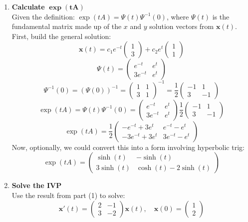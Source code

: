 \documentclass[12pt]{article}
\begin{document}
\begin{enumerate}  
    \item \textbf{Calculate} $\boldsymbol{\exp(tA)}$ \\
    Given the definition: $\exp(tA) = \Psi(t) \Psi^{-1}(0)$, where $\Psi(t)$ is the fundamental matrix made up of the $x$ and $y$ solution vectors from $\mathbf{x}(t)$. \\
    First, build the general solution: 
    \[ \mathbf{x}(t) = c_1 e^{-t} \begin{pmatrix} 1 \\ 3 \end{pmatrix} + c_2 e^{t} \begin{pmatrix} 1 \\ 1 \end{pmatrix} \]
    \[\Psi(t) = \begin{pmatrix} e^{-t} & e^{t} \\ 3e^{-t} & e^{t}\end{pmatrix}\]
    \[\Psi^{-1}(0) = (\Psi(0))^{-1} = \begin{pmatrix} 1 & 1 \\ 3 & 1 \end{pmatrix}^{-1} = \frac{1}{2} \begin{pmatrix} -1 & 1 \\ 3 & -1 \end{pmatrix}\]
    \[ \exp(tA) = \Psi(t)\Psi^{-1}(0) = \begin{pmatrix} e^{-t} & e^{t} \\ 3e^{-t} & e^{t}\end{pmatrix} \frac{1}{2} \begin{pmatrix} -1 & 1 \\ 3 & -1 \end{pmatrix}\]
    \[ \exp(tA) = \frac{1}{2} \begin{pmatrix} -e^{-t} + 3e^{t} & e^{-t} - e^{t} \\ -3e^{-t}+3e^{t} & 3e^{-t} - e^{t}\end{pmatrix}\]
    Now, optionally, we could convert this into a form involving hyperbolic trig:
    \[ \exp(tA) = \begin{pmatrix} \sinh(t) & -\sinh(t) \\ 3\sinh(t) & \cosh(t) - 2\sinh(t) \end{pmatrix}\]
    \item \textbf{Solve the IVP} \\
    Use the result from part (1) to solve:
    \[ \mathbf{x}'(t) = \begin{pmatrix} 2 & -1 \\ 3 & -2 \end{pmatrix} \mathbf{x}(t), \quad \mathbf{x}(0) = \begin{pmatrix} 1 \\ 2 \end{pmatrix} \]

\end{enumerate}
\end{document}
